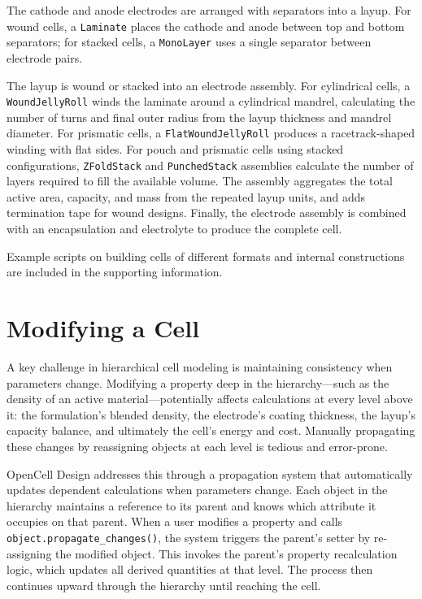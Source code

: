 \documentclass[12pt]{article}
\begin{document}
The cathode and anode electrodes are arranged with separators into a layup. For wound cells, a \texttt{Laminate} places the cathode and anode between top and bottom separators; for stacked cells, a \texttt{MonoLayer} uses a single separator between electrode pairs.

The layup is wound or stacked into an electrode assembly. For cylindrical cells, a \texttt{WoundJellyRoll} winds the laminate around a cylindrical mandrel, calculating the number of turns and final outer radius from the layup thickness and mandrel diameter. For prismatic cells, a \texttt{FlatWoundJellyRoll} produces a racetrack-shaped winding with flat sides. For pouch and prismatic cells using stacked configurations, \texttt{ZFoldStack} and \texttt{PunchedStack} assemblies calculate the number of layers required to fill the available volume. The assembly aggregates the total active area, capacity, and mass from the repeated layup units, and adds termination tape for wound designs. Finally, the electrode assembly is combined with an encapsulation and electrolyte to produce the complete cell.

Example scripts on building cells of different formats and internal constructions are included in the supporting information.

\section{Modifying a Cell}

A key challenge in hierarchical cell modeling is maintaining consistency when parameters change. Modifying a property deep in the hierarchy---such as the density of an active material---potentially affects calculations at every level above it: the formulation's blended density, the electrode's coating thickness, the layup's capacity balance, and ultimately the cell's energy and cost. Manually propagating these changes by reassigning objects at each level is tedious and error-prone.

OpenCell Design addresses this through a propagation system that automatically updates dependent calculations when parameters change. Each object in the hierarchy maintains a reference to its parent and knows which attribute it occupies on that parent. When a user modifies a property and calls \texttt{object.propagate\_changes()}, the system triggers the parent's setter by re-assigning the modified object. This invokes the parent's property recalculation logic, which updates all derived quantities at that level. The process then continues upward through the hierarchy until reaching the cell.
\end{document}
